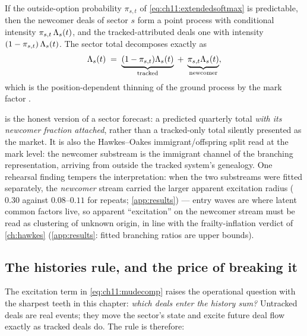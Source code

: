 \begin{corollary}\label{cor:ch11:split}
If the outside-option probability $\pi_{s,t}$ of
\cref{eq:ch11:extendedsoftmax} is predictable, then the newcomer deals of
sector $s$ form a point process with conditional intensity
$\pi_{s,t}\,\Lambda_s(t)$, and the tracked-attributed deals one with
intensity $(1-\pi_{s,t})\,\Lambda_s(t)$. The sector total decomposes
exactly as
\begin{equation}\label{eq:ch11:newintensity}
\Lambda_s(t) \;=\; \underbrace{(1-\pi_{s,t})\Lambda_s(t)}_{\text{tracked}}
\;+\; \underbrace{\pi_{s,t}\Lambda_s(t)}_{\text{newcomer}},
\end{equation}
which is the position-dependent thinning of the ground process by the
mark factor \citep[Ch.~5]{daley2003}.
\end{corollary}

 is the honest version of a sector forecast:
a predicted quarterly total \emph{with its newcomer fraction attached},
rather than a tracked-only total silently presented as the market. It is
also the Hawkes--Oakes immigrant/offspring split
\citep{hawkesoakes1974} read at the mark level: the newcomer substream is
the immigrant channel of the branching representation, arriving from
outside the tracked system's genealogy. One rehearsal finding tempers the
interpretation: when the two substreams were fitted separately, the
\emph{newcomer} stream carried the larger apparent excitation radius
($0.30$ against $0.08$--$0.11$ for repeats; \cref{app:results}) --- entry
waves are where latent common factors live, so apparent ``excitation'' on
the newcomer stream must be read as clustering of unknown origin, in line
with the frailty-inflation verdict of \cref{ch:hawkes}
(\cref{app:results}: fitted branching ratios are upper bounds).

\subsection{The histories rule, and the price of breaking it}\label{ch11:sec:histories}

The excitation term in \cref{eq:ch11:mudecomp} raises the operational
question with the sharpest teeth in this chapter: \emph{which deals enter
the history sum?} Untracked deals are real events; they move the sector's
state and excite future deal flow exactly as tracked deals do. The rule
is therefore:

